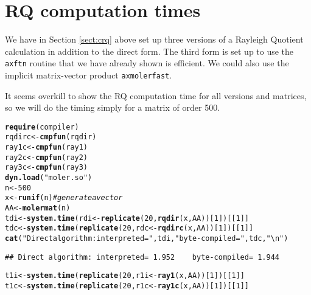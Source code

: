 \documentclass[10pt]{article}\usepackage[]{graphicx}\usepackage[]{color}
\makeatletter
\newcommand{\hlnum}[1]{\textcolor[rgb]{0.686,0.059,0.569}{#1}}%
\newcommand{\hlstr}[1]{\textcolor[rgb]{0.192,0.494,0.8}{#1}}%
\newcommand{\hlcom}[1]{\textcolor[rgb]{0.678,0.584,0.686}{\textit{#1}}}%
\newcommand{\hlstd}[1]{\textcolor[rgb]{0.345,0.345,0.345}{#1}}%
\newcommand{\hlkwb}[1]{\textcolor[rgb]{0.69,0.353,0.396}{#1}}%
\newcommand{\hlkwd}[1]{\textcolor[rgb]{0.737,0.353,0.396}{\textbf{#1}}}%
\newenvironment{kframe}{%
 \def\at@end@of@kframe{}%
 \ifinner\ifhmode%
  \def\at@end@of@kframe{\end{minipage}}%
  \begin{minipage}{\columnwidth}%
 \fi\fi%
 \def\FrameCommand##1{\hskip\@totalleftmargin \hskip-\fboxsep
 \colorbox{shadecolor}{##1}\hskip-\fboxsep
     \hskip-\linewidth \hskip-\@totalleftmargin \hskip\columnwidth}%
 \MakeFramed {\advance\hsize-\width
   \@totalleftmargin\z@ \linewidth\hsize
   \@setminipage}}%
 {\par\unskip\endMakeFramed%
 \at@end@of@kframe}
\newenvironment{knitrout}{}{} %
\newcommand{\code}[1]{{\tt #1}}
\makeatother
\begin{document}
\section{RQ computation times}

We have in Section \ref{sect:crq} above set up three versions of a Rayleigh 
Quotient calculation in addition to the direct form. The third 
form is set up to use the \code{axftn} routine that we have 
already shown is efficient. We could also use the
implicit matrix-vector product \code{axmolerfast}.

It seems overkill to show the RQ computation time for all versions
and matrices, so we will do the timing simply for a matrix of 
order 500.

\begin{knitrout}\scriptsize
{}\color{fgcolor}\begin{kframe}
\begin{alltt}
\hlkwd{require}\hlstd{(compiler)}
\hlstd{rqdirc}\hlkwb{<-}\hlkwd{cmpfun}\hlstd{(rqdir)}
\hlstd{ray1c}\hlkwb{<-}\hlkwd{cmpfun}\hlstd{(ray1)}
\hlstd{ray2c}\hlkwb{<-}\hlkwd{cmpfun}\hlstd{(ray2)}
\hlstd{ray3c}\hlkwb{<-}\hlkwd{cmpfun}\hlstd{(ray3)}
\hlkwd{dyn.load}\hlstd{(}\hlstr{"moler.so"}\hlstd{)}
  \hlstd{n}\hlkwb{<-}\hlnum{500}
  \hlstd{x}\hlkwb{<-}\hlkwd{runif}\hlstd{(n)} \hlcom{# generate a vector }
  \hlstd{AA}\hlkwb{<-}\hlkwd{molermat}\hlstd{(n)}
  \hlstd{tdi}\hlkwb{<-}\hlkwd{system.time}\hlstd{(rdi}\hlkwb{<-}\hlkwd{replicate}\hlstd{(}\hlnum{20}\hlstd{,}\hlkwd{rqdir}\hlstd{(x, AA))[}\hlnum{1}\hlstd{])[[}\hlnum{1}\hlstd{]]}
  \hlstd{tdc}\hlkwb{<-}\hlkwd{system.time}\hlstd{(}\hlkwd{replicate}\hlstd{(}\hlnum{20}\hlstd{,rdc}\hlkwb{<-}\hlkwd{rqdirc}\hlstd{(x, AA))[}\hlnum{1}\hlstd{])[[}\hlnum{1}\hlstd{]]}
  \hlkwd{cat}\hlstd{(}\hlstr{"Direct algorithm: interpreted="}\hlstd{,tdi,}\hlstr{"   byte-compiled="}\hlstd{,tdc,}\hlstr{"\textbackslash{}n"}\hlstd{)}
\end{alltt}
\begin{verbatim}
## Direct algorithm: interpreted= 1.952    byte-compiled= 1.944
\end{verbatim}
\begin{alltt}
  \hlstd{t1i}\hlkwb{<-}\hlkwd{system.time}\hlstd{(}\hlkwd{replicate}\hlstd{(}\hlnum{20}\hlstd{,r1i}\hlkwb{<-}\hlkwd{ray1}\hlstd{(x, AA))[}\hlnum{1}\hlstd{])[[}\hlnum{1}\hlstd{]]}
  \hlstd{t1c}\hlkwb{<-}\hlkwd{system.time}\hlstd{(}\hlkwd{replicate}\hlstd{(}\hlnum{20}\hlstd{,r1c}\hlkwb{<-}\hlkwd{ray1c}\hlstd{(x, AA))[}\hlnum{1}\hlstd{])[[}\hlnum{1}\hlstd{]]}

\end{alltt}
\end{kframe}
\end{knitrout}
\end{document}
